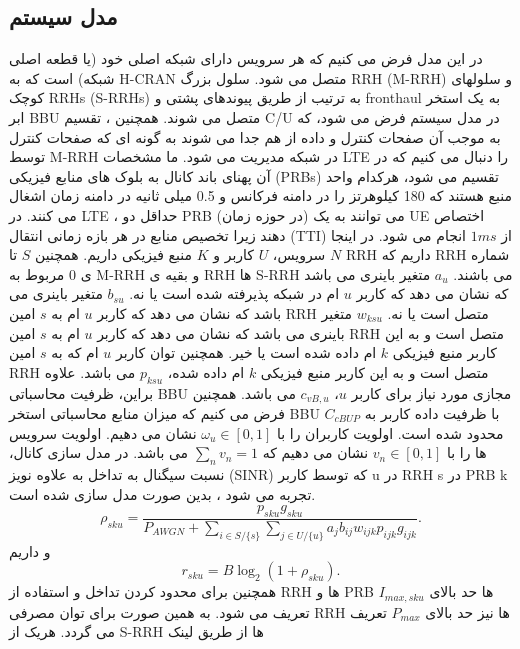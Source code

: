 \subsection{مدل سیستم}
در این مدل فرض می کنیم که هر سرویس دارای شبکه اصلی خود (یا قطعه اصلی شبکه) است که به H-CRAN متصل می شود.
سلول بزرگ RRH (M-RRH) و سلولهای کوچک RRHs (S-RRHs) به ترتیب از طریق پیوندهای پشتی و fronthaul به یک استخر ابر
BBU  متصل می شوند.
همچنین ، تقسیم C/U در مدل سیستم فرض می شود، که به موجب آن صفحات کنترل و داده از هم جدا می شوند به گونه ای که صفحات کنترل توسط M-RRH در شبکه مدیریت می شود.
ما مشخصات LTE را دنبال می کنیم که در آن پهنای باند کانال به بلوک های منابع فیزیکی (PRBs) تقسیم می شود، هرکدام واحد منبع هستند که 180 کیلوهرتز را در دامنه فرکانس و 0.5 میلی ثانیه در دامنه زمان اشغال می کنند.
در LTE ، حداقل دو PRB (در حوزه زمان) می توانند به یک UE اختصاص دهند زیرا تخصیص منابع در هر بازه زمانی انتقال (TTI) از
$1ms$
 انجام می شود.
 در اینجا
$N$
سرویس، $U$ کاربر و $K$  منبع فیزیکی داریم. همچنین $S$ تا RRH داریم که RRH شماره ی $0$ مربوط به M-RRH  و بقیه ی RRH ها S-RRH می باشند.
$a_u$
متغیر باینری می باشد که نشان می دهد که کاربر $u$ ام در شبکه پذیرفته شده است یا نه.
$b_{su}$
 متغیر باینری می باشد که نشان می دهد که کاربر $u$ ام به $s$ امین RRH متصل است یا نه.
$w_{ksu}$
 متغیر باینری می باشد که نشان می دهد که کاربر $u$ ام به $s$ امین RRH متصل است و به این کاربر منبع فیزیکی $k$ ام داده شده است یا خیر.
 همچنین توان 
 کاربر $u$ ام که به $s$ امین RRH متصل است و به این کاربر منبع فیزیکی $k$ ام داده شده، $p_{ksu}$ می باشد.
 علاوه براین، ظرفیت محاسباتی BBU مجازی مورد نیاز برای کاربر $u$، 
 $c_{vB,u}$
  می باشد.
   همچنین فرض می کنیم که میزان منابع محاسباتی استخر BBU با ظرفیت داده کاربر به
   $C_{cBUP}$ 
   محدود شده است.
   اولویت کاربران را با 
   $\omega_u \in [0,1]$
   نشان می دهیم.
   اولویت سرویس ها را با 
   $v_n \in [0,1]$
   نشان می دهیم
   که 
   $\sum_n v_n =1$ 
   می باشد.
   در مدل سازی کانال، نسبت سیگنال به تداخل به علاوه نویز (SINR) که توسط کاربر u در RRH s در PRB
   k
     تجربه می شود ، بدین صورت مدل سازی شده است.
 \begin{equation}
 \rho_{sku} = \frac{p_{sku}g_{sku}}{P_{AWGN}+\sum_{i\in S/\{s\}}\sum_{j\in U/\{u\}}a_j b_{ij}w_{ijk}p_{ijk}g_{ijk}}.
 \end{equation}
 و داریم 
 \begin{equation}
 r_{sku} = B\log_2{(1+\rho_{sku})}.
 \end{equation}
 همچنین برای محدود کردن تداخل و استفاده از RRH ها و PRB ها حد بالای $I_{max,sku}$ تعریف می شود.
 به همین صورت برای توان مصرفی RRH  ها نیز حد بالای 
 $P_{max}$
تعریف می گردد.
هریک از S-RRH ها از طریق لینک 
